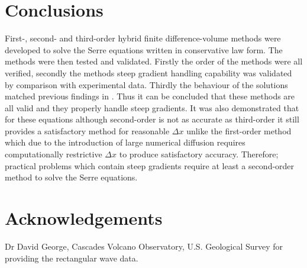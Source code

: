 \documentclass[SingleSpace,12pt,Proceedings]{Serre_ASCE}
\begin{document}
\section{Conclusions}
\label{section:Conclusions}
First-, second- and third-order hybrid finite difference-volume methods were developed to solve the Serre equations written in conservative law form. The methods were then tested and validated. Firstly the order of the methods were all verified, secondly the methods steep gradient handling capability was validated by comparison with experimental data. Thirdly the behaviour of the solutions matched previous findings in . Thus it can be concluded that these methods are all valid and they properly handle steep gradients. It was also demonstrated that for these equations although second-order is not as accurate as third-order it still provides a satisfactory method for reasonable $\Delta x$ unlike the first-order method which due to the introduction of large numerical diffusion requires computationally restrictive $\Delta x$ to produce satisfactory accuracy. Therefore; practical problems which contain steep gradients require at least a second-order method to solve the Serre equations. 
\newpage
\section{Acknowledgements}
Dr David George, Cascades Volcano Observatory, U.S. Geological Survey for providing the rectangular wave data.



\end{document}
